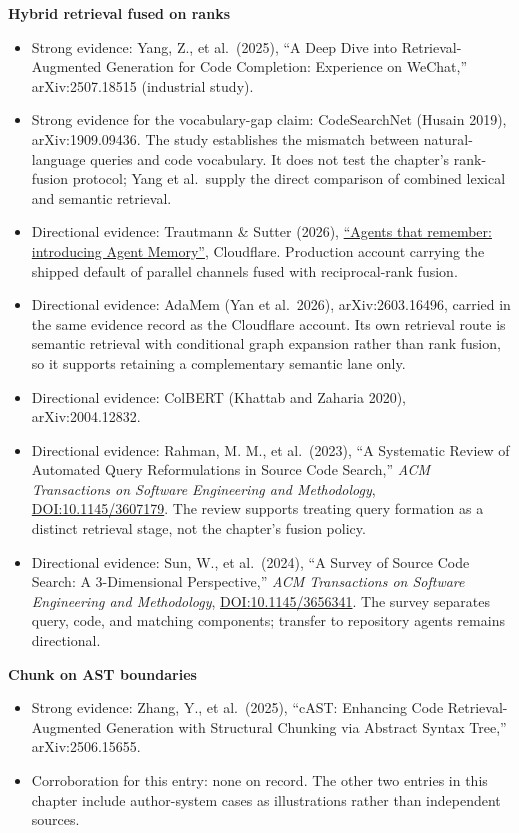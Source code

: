\textbf{Hybrid retrieval fused on ranks}

\begin{itemize}
\tightlist
\item
  Strong evidence: Yang, Z., et al.~(2025), ``A Deep Dive into Retrieval-Augmented Generation for Code Completion: Experience on WeChat,'' arXiv:2507.18515 (industrial study).
\item
  Strong evidence for the vocabulary-gap claim: CodeSearchNet (Husain 2019), arXiv:1909.09436. The study establishes the mismatch between natural-language queries and code vocabulary. It does not test the chapter's rank-fusion protocol; Yang et al.~supply the direct comparison of combined lexical and semantic retrieval.
\item
  Directional evidence: Trautmann \& Sutter (2026), \href{https://blog.cloudflare.com/introducing-agent-memory/}{``Agents that remember: introducing Agent Memory''}, Cloudflare. Production account carrying the shipped default of parallel channels fused with reciprocal-rank fusion.
\item
  Directional evidence: AdaMem (Yan et al.~2026), arXiv:2603.16496, carried in the same evidence record as the Cloudflare account. Its own retrieval route is semantic retrieval with conditional graph expansion rather than rank fusion, so it supports retaining a complementary semantic lane only.
\item
  Directional evidence: ColBERT (Khattab and Zaharia 2020), arXiv:2004.12832.
\item
  Directional evidence: Rahman, M. M., et al.~(2023), ``A Systematic Review of Automated Query Reformulations in Source Code Search,'' \emph{ACM Transactions on Software Engineering and Methodology}, \href{https://doi.org/10.1145/3607179}{DOI:10.1145/3607179}. The review supports treating query formation as a distinct retrieval stage, not the chapter's fusion policy.
\item
  Directional evidence: Sun, W., et al.~(2024), ``A Survey of Source Code Search: A 3-Dimensional Perspective,'' \emph{ACM Transactions on Software Engineering and Methodology}, \href{https://doi.org/10.1145/3656341}{DOI:10.1145/3656341}. The survey separates query, code, and matching components; transfer to repository agents remains directional.
\end{itemize}

\textbf{Chunk on AST boundaries}

\begin{itemize}
\tightlist
\item
  Strong evidence: Zhang, Y., et al.~(2025), ``cAST: Enhancing Code Retrieval-Augmented Generation with Structural Chunking via Abstract Syntax Tree,'' arXiv:2506.15655.
\item
  Corroboration for this entry: none on record. The other two entries in this chapter include author-system cases as illustrations rather than independent sources.
\end{itemize}
